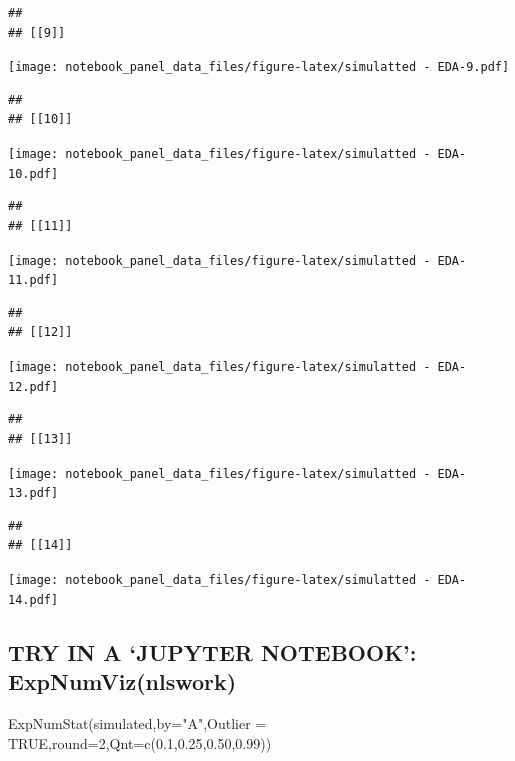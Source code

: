 \documentclass[
]{article}
\newenvironment{Shaded}{\begin{snugshade}}{\end{snugshade}}
\newcommand{\AttributeTok}[1]{\textcolor[rgb]{0.77,0.63,0.00}{#1}}
\newcommand{\ConstantTok}[1]{\textcolor[rgb]{0.00,0.00,0.00}{#1}}
\newcommand{\DecValTok}[1]{\textcolor[rgb]{0.00,0.00,0.81}{#1}}
\newcommand{\FloatTok}[1]{\textcolor[rgb]{0.00,0.00,0.81}{#1}}
\newcommand{\FunctionTok}[1]{\textcolor[rgb]{0.00,0.00,0.00}{#1}}
\newcommand{\NormalTok}[1]{#1}
\newcommand{\StringTok}[1]{\textcolor[rgb]{0.31,0.60,0.02}{#1}}
\begin{document}
\begin{verbatim}
## 
## [[9]]
\end{verbatim}

\texttt{[image: notebook\_panel\_data\_files/figure-latex/simulatted - EDA-9.pdf]}

\begin{verbatim}
## 
## [[10]]
\end{verbatim}

\texttt{[image: notebook\_panel\_data\_files/figure-latex/simulatted - EDA-10.pdf]}

\begin{verbatim}
## 
## [[11]]
\end{verbatim}

\texttt{[image: notebook\_panel\_data\_files/figure-latex/simulatted - EDA-11.pdf]}

\begin{verbatim}
## 
## [[12]]
\end{verbatim}

\texttt{[image: notebook\_panel\_data\_files/figure-latex/simulatted - EDA-12.pdf]}

\begin{verbatim}
## 
## [[13]]
\end{verbatim}

\texttt{[image: notebook\_panel\_data\_files/figure-latex/simulatted - EDA-13.pdf]}

\begin{verbatim}
## 
## [[14]]
\end{verbatim}

\texttt{[image: notebook\_panel\_data\_files/figure-latex/simulatted - EDA-14.pdf]}

\hypertarget{try-in-a-jupyter-notebook-expnumviznlswork}{%
\subsection{TRY IN A `JUPYTER NOTEBOOK':
ExpNumViz(nlswork)}\label{try-in-a-jupyter-notebook-expnumviznlswork}}

\begin{Shaded}
\begin{Highlighting}[]
  \FunctionTok{ExpNumStat}\NormalTok{(simulated,}\AttributeTok{by=}\StringTok{"A"}\NormalTok{,}\AttributeTok{Outlier =} \ConstantTok{TRUE}\NormalTok{,}\AttributeTok{round=}\DecValTok{2}\NormalTok{,}\AttributeTok{Qnt=}\FunctionTok{c}\NormalTok{(}\FloatTok{0.1}\NormalTok{,}\FloatTok{0.25}\NormalTok{,}\FloatTok{0.50}\NormalTok{,}\FloatTok{0.99}\NormalTok{))}
\end{Highlighting}
\end{Shaded}
\end{document}
